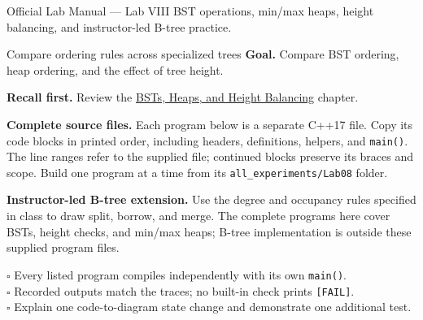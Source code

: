 
\begin{sourcealignment}{Official Lab Manual --- Lab VIII}
BST operations, min/max heaps, height balancing, and instructor-led B-tree practice.
\end{sourcealignment}

\begin{labproject}{Compare ordering rules across specialized trees}
\textbf{Goal.} Compare BST ordering, heap ordering, and the effect of tree height.

\textbf{Recall first.} Review the \hyperref[ch:trees-ii]{BSTs, Heaps, and Height Balancing} chapter.

\textbf{Complete source files.} Each program below is a separate C++17 file.
Copy its code blocks in printed order, including headers, definitions, helpers, and \texttt{main()}.
The line ranges refer to the supplied file; continued blocks preserve its braces and scope.
Build one program at a time from its \texttt{all\_experiments/Lab08} folder.



\tcbbreak

\textbf{Instructor-led B-tree extension.} Use the degree and occupancy rules specified in class to draw split, borrow, and merge. The complete programs here cover BSTs, height checks, and min/max heaps; B-tree implementation is outside these supplied program files.
\end{labproject}

\begin{verification}
$\square$ Every listed program compiles independently with its own \texttt{main()}.\\
$\square$ Recorded outputs match the traces; no built-in check prints \texttt{[FAIL]}.\\
$\square$ Explain one code-to-diagram state change and demonstrate one additional test.
\end{verification}
